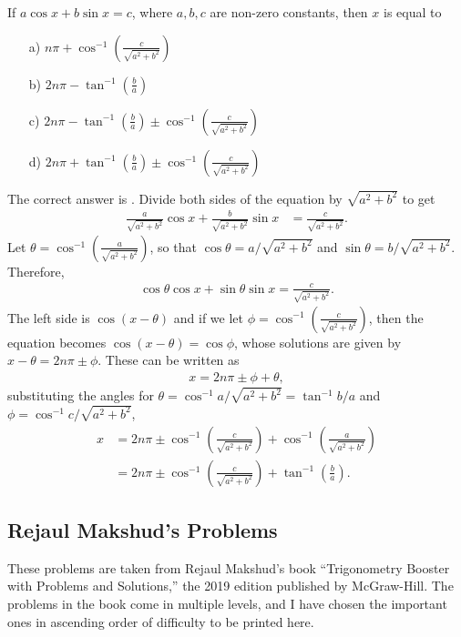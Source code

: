 \documentclass[12pt,a4paper]{memoir}
\theoremstyle{definition}
\newcommand{\correct}{
    \PrintSolutionsTF{%
        \ref{ans:\CurrentQuestionID}%
        }{%
        \label{ans:\CurrentQuestionID}%
        }%
}
\begin{document}
\begin{question}
	If $a \cos x + b \sin x = c$, where $a,b,c$ are non-zero constants, then $x$ is equal to
	\begin{enumerate}
		\item[a)] $\displaystyle n\pi + \cos^{-1}\left(\frac{c}{\sqrt{a^2+b^2}}\right)$
		\item[b)] $\displaystyle 2n\pi - \tan^{-1}\left(\frac{b}{a}\right)$
		\item[c)] $\displaystyle 2n\pi - \tan^{-1}\left(\frac{b}{a}\right) \pm \cos^{-1}\left(\frac{c}{\sqrt{a^2+b^2}}\right)$
		\item[d)] \correct $\displaystyle 2n\pi + \tan^{-1}\left(\frac{b}{a}\right) \pm \cos^{-1}\left(\frac{c}{\sqrt{a^2+b^2}}\right)$
	\end{enumerate}
\end{question}
\begin{solution}
	The correct answer is \correct. Divide both sides of the equation by $\sqrt{a^2+b^2}$ to get
	\begin{align*}
		\frac{a}{\sqrt{a^2+b^2}} \cos x + \frac{b}{\sqrt{a^2+b^2}}\sin x &= \frac{c}{\sqrt{a^2+b^2}}.
	\end{align*}
	Let $\theta = \cos^{-1}\left(\frac{a}{\sqrt{a^2+b^2}}\right)$, so that $\cos \theta = a/\sqrt{a^2+b^2}$ and $\sin \theta = b/\sqrt{a^2+b^2}$. Therefore, 
	\begin{align*}
		\cos \theta \cos x + \sin \theta \sin x = \frac{c}{\sqrt{a^2+b^2}}.
	\end{align*}
	The left side is $\cos(x-\theta)$ and if we let $\phi = \cos^{-1}\left(\frac{c}{\sqrt{a^2+b^2}}\right)$, then the equation becomes $\cos(x-\theta)=\cos \phi$, whose solutions are given by $x - \theta = 2n\pi \pm \phi$. These can be written as
	\begin{align*}
		x=2n\pi \pm \phi + \theta,
	\end{align*}
	substituting the angles for $\theta = \cos^{-1} a/\sqrt{a^2+b^2}=\tan^{-1} b/a$ and $\phi = \cos^{-1}c/\sqrt{a^2+b^2}$,
	\begin{align*}
		x &=2n\pi \pm \cos^{-1}\left(\frac{c}{\sqrt{a^2+b^2}}\right) + \cos^{-1}\left(\frac{a}{\sqrt{a^2+b^2}}\right)\\
		&= 2n\pi \pm \cos^{-1}\left(\frac{c}{\sqrt{a^2+b^2}}\right) + \tan^{-1}\left(\frac{b}{a}\right).
	\end{align*}
\end{solution}


\subsection{Rejaul Makshud's Problems}
These problems are taken from Rejaul Makshud's book ``Trigonometry Booster with Problems and Solutions,'' the 2019 edition published by McGraw-Hill. The problems in the book come in multiple levels, and I have chosen the important ones in ascending order of difficulty to be printed here.
\end{document}

